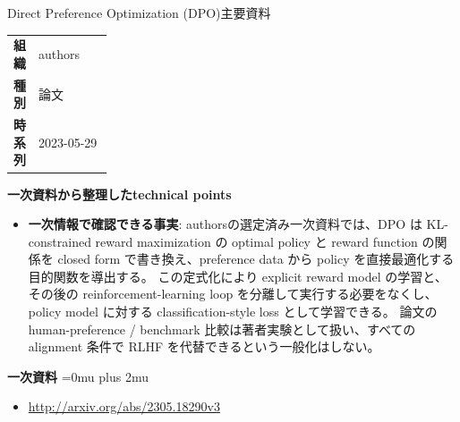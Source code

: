 \begin{technicalnote}{Direct Preference Optimization (DPO)}{主要資料}
\begingroup
\begin{tabularx}{\linewidth}{@{}>{\bfseries}p{0.22\linewidth}X@{}}
組織 & authors \\
種別 & 論文 \\
時系列 & 2023-05-29 \\
\end{tabularx}
\smallskip
{\bfseries 一次資料から整理したtechnical points}
\begin{itemize}[leftmargin=1.5em,itemsep=0.35em]
\item \textbf{一次情報で確認できる事実}: authorsの選定済み一次資料では、DPO は KL-constrained reward maximization の optimal policy と reward function の関係を closed form で書き換え、preference data から policy を直接最適化する目的関数を導出する。 この定式化により explicit reward model の学習と、その後の reinforcement-learning loop を分離して実行する必要をなくし、policy model に対する classification-style loss として学習できる。 論文の human-preference / benchmark 比較は著者実験として扱い、すべての alignment 条件で RLHF を代替できるという一般化はしない。
\end{itemize}
\begin{minipage}{\linewidth}
\begin{samepage}
{\bfseries 一次資料}
\begingroup\sloppy
\Urlmuskip=0mu plus 2mu\relax
\begin{itemize}[leftmargin=1.5em,itemsep=0.25em]
\item {\scriptsize\url{http://arxiv.org/abs/2305.18290v3}}
\end{itemize}
\endgroup
\end{samepage}
\end{minipage}
\endgroup
\end{technicalnote}
\medskip

